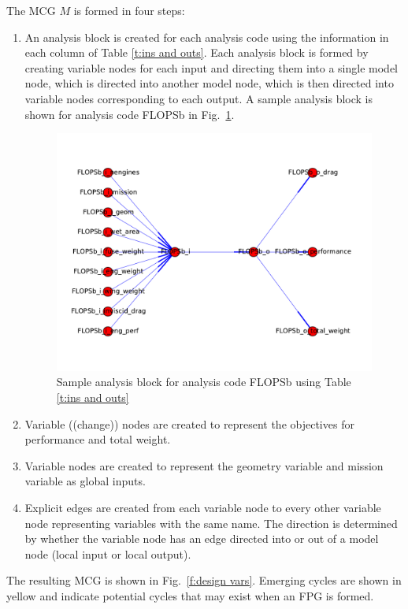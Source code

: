 	The MCG $M$ is formed in four steps:
	\begin{enumerate}
	\item An analysis block is created for each analysis code using the information in each column of Table \ref{t:ins and outs}. Each analysis block is formed by creating variable nodes for each input and directing them into a single model node, which is directed into another model node, which is then directed into variable nodes corresponding to each output. 
	A sample analysis block is shown for analysis code FLOPSb in Fig.~\ref{f:FLOPSb analysis block}.
	\begin{figure}[htb!]
	  \begin{center}
		\includegraphics[width=.6\textwidth]{images/FLOPSb_analysis_block}
	  \end{center}
	  \caption{Sample analysis block for analysis code FLOPSb using Table \ref{t:ins and outs}}
	\label{f:FLOPSb analysis block}
	\end{figure}

	\item Variable ((change)) nodes are created to represent the objectives for performance and total weight.

	\item Variable nodes are created to represent the geometry variable and mission variable as global inputs.

	\item Explicit edges are created from each variable node to every other variable node representing variables with the same name. The direction is determined by whether the variable node has an edge directed into or out of a model node (local input or local output).
	\end{enumerate}
	The resulting MCG is shown in Fig.~\ref{f:design vars}. Emerging cycles are shown in yellow and indicate potential cycles that may exist when an FPG is formed.
